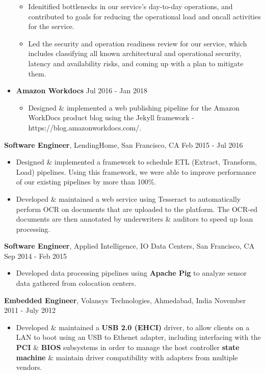 \documentclass[10pt, a4paper]{article}
\begin{document}
\begin{itemize}
\begin{itemize}[label=$\bullet$]
  \item Idenitified bottlenecks in our service's day-to-day operations, and contributed to goals for reducing the operational load and oncall activities for the service.
  \item Led the security and operation readiness review for our service, which includes classifying all known architectural and operational security, latency and availability risks, and coming up with a plan to mitigate them.
  \end{itemize}
\item \textbf{Amazon Workdocs} \hfill Jul 2016 - Jan 2018
  \begin{itemize}[label=$\bullet$]
    \item Designed \& implemented a web publishing pipeline for the Amazon WorkDocs product blog using the Jekyll framework - https://blog.amazonworkdocs.com/.
  \end{itemize}
\end{itemize}
\textbf{Software Engineer}, LendingHome, San Francisco, CA \hfill Feb 2015 - Jul 2016
\begin{itemize}
\item Designed \& implemented a framework to schedule ETL (Extract, Transform, Load) pipelines. Using this framework, we were able to improve performance of our existing pipelines by more than 100\%.
\item Developed \& maintained a web service using Tesseract to automatically perform OCR on documents that are uploaded to the platform. The OCR-ed documents are then annotated by underwriters \& auditors to speed up loan processing.
\end{itemize}
\textbf{Software Engineer}, Applied Intelligence, IO Data Centers, San Francisco, CA \hfill Sep 2014 - Feb 2015
\begin{itemize}
\item Developed data processing pipelines using \textbf{Apache Pig} to analyze sensor data gathered from colocation centers.
\end{itemize}
\textbf{Embedded Engineer}, Volansys Technologies, Ahmedabad, India \hfill November 2011 - July 2012
\begin{itemize}
\item Developed \& maintained a \textbf{USB 2.0 (EHCI)} driver, to allow clients on a LAN to boot using an USB to Ethenet adapter, including interfacing with the \textbf{PCI} \& \textbf{BIOS} subsystems in order to manage the host controller \textbf{state machine} \& maintain driver compatibility with adapters from multiple vendors. 
\end{itemize}
\end{document}
